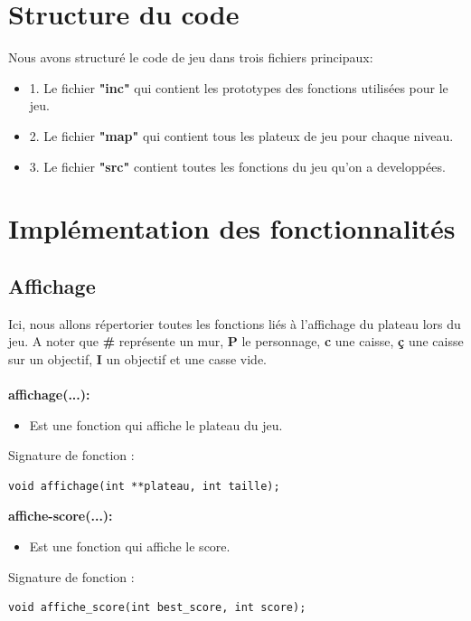 \documentclass[12pt,french]{article}
\begin{document}
\section{Structure du code}
Nous avons structuré le code de jeu dans trois fichiers principaux:
\begin{itemize}
    \item 1. Le fichier \textbf{"inc"} qui contient les prototypes des fonctions utilisées pour le jeu.
    \item 2. Le fichier \textbf{"map"} qui contient tous les plateux de jeu pour chaque niveau.
    \item 3. Le fichier \textbf{"src"} contient toutes les fonctions du jeu qu'on a developpées. 
\end{itemize}
\section{Implémentation des fonctionnalités}
\subsection{Affichage}

Ici, nous allons répertorier toutes les fonctions liés à l'affichage du plateau lors du jeu. A noter que \textbf{\#} représente un mur, \textbf{P} le personnage, \textbf{c} une caisse, \textbf{ç} une caisse sur un objectif, \textbf{I} un objectif et \textbf{ } une casse vide.\\\\

\textbf{affichage(...):}
\begin{itemize}
\item Est une fonction qui affiche le plateau du jeu.
\end{itemize}

Signature de fonction :
\begin{lstlisting}
void affichage(int **plateau, int taille);
\end{lstlisting}

\textbf{affiche-score(...):}
\begin{itemize}
\item Est une fonction qui affiche le score.
\end{itemize}

Signature de fonction :
\begin{lstlisting}
void affiche_score(int best_score, int score);
\end{lstlisting}
\end{document}
